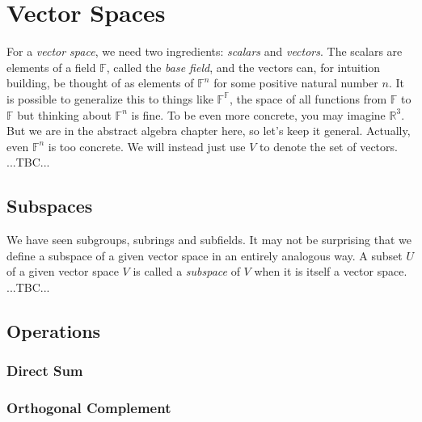 \section{Vector Spaces}
For a \emph{vector space}, we need two ingredients: \emph{scalars} and \emph{vectors}. The scalars are elements of a field $\mathbb{F}$, called the \emph{base field}, and the vectors can, for intuition building, be thought of as elements of $\mathbb{F}^n$ for some positive natural number $n$. It is possible to generalize this to things like $\mathbb{F}^\mathbb{F}$, the space of all functions from $\mathbb{F}$ to $\mathbb{F}$ but thinking about $\mathbb{F}^n$ is fine. To be even more concrete, you may imagine $\mathbb{R}^3$. But we are in the abstract algebra chapter here, so let's keep it general. Actually, even $\mathbb{F}^n$ is too concrete. We will instead just use $V$ to denote the set of vectors. ...TBC...


\subsection{Subspaces} 
We have seen subgroups, subrings and subfields. It may not be surprising that we define a subspace of a given vector space in an entirely analogous way. A subset $U$ of a given vector space $V$ is called a \emph{subspace} of $V$ when it is itself a vector space. ...TBC...



\subsection{Operations}



\subsubsection{Direct Sum}



\subsubsection{Orthogonal Complement}

